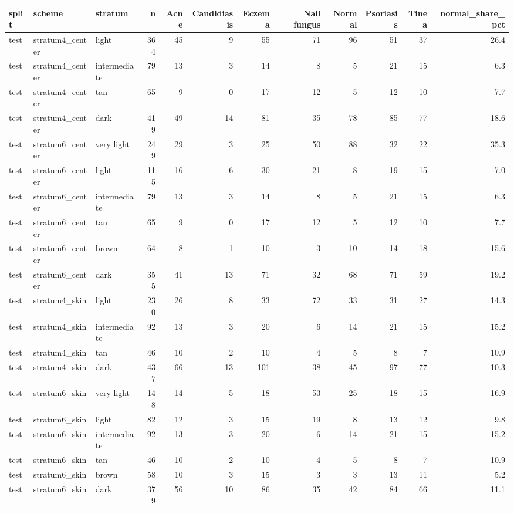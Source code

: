 \begin{tabular}{lllrrrrrrrrr}
\toprule
split & scheme & stratum & n & Acne & Candidiasis & Eczema & Nail fungus & Normal & Psoriasis & Tinea & normal\_share\_pct \\
\midrule
test & stratum4\_center & light & 364 & 45 & 9 & 55 & 71 & 96 & 51 & 37 & 26.4 \\
test & stratum4\_center & intermediate & 79 & 13 & 3 & 14 & 8 & 5 & 21 & 15 & 6.3 \\
test & stratum4\_center & tan & 65 & 9 & 0 & 17 & 12 & 5 & 12 & 10 & 7.7 \\
test & stratum4\_center & dark & 419 & 49 & 14 & 81 & 35 & 78 & 85 & 77 & 18.6 \\
test & stratum6\_center & very light & 249 & 29 & 3 & 25 & 50 & 88 & 32 & 22 & 35.3 \\
test & stratum6\_center & light & 115 & 16 & 6 & 30 & 21 & 8 & 19 & 15 & 7.0 \\
test & stratum6\_center & intermediate & 79 & 13 & 3 & 14 & 8 & 5 & 21 & 15 & 6.3 \\
test & stratum6\_center & tan & 65 & 9 & 0 & 17 & 12 & 5 & 12 & 10 & 7.7 \\
test & stratum6\_center & brown & 64 & 8 & 1 & 10 & 3 & 10 & 14 & 18 & 15.6 \\
test & stratum6\_center & dark & 355 & 41 & 13 & 71 & 32 & 68 & 71 & 59 & 19.2 \\
test & stratum4\_skin & light & 230 & 26 & 8 & 33 & 72 & 33 & 31 & 27 & 14.3 \\
test & stratum4\_skin & intermediate & 92 & 13 & 3 & 20 & 6 & 14 & 21 & 15 & 15.2 \\
test & stratum4\_skin & tan & 46 & 10 & 2 & 10 & 4 & 5 & 8 & 7 & 10.9 \\
test & stratum4\_skin & dark & 437 & 66 & 13 & 101 & 38 & 45 & 97 & 77 & 10.3 \\
test & stratum6\_skin & very light & 148 & 14 & 5 & 18 & 53 & 25 & 18 & 15 & 16.9 \\
test & stratum6\_skin & light & 82 & 12 & 3 & 15 & 19 & 8 & 13 & 12 & 9.8 \\
test & stratum6\_skin & intermediate & 92 & 13 & 3 & 20 & 6 & 14 & 21 & 15 & 15.2 \\
test & stratum6\_skin & tan & 46 & 10 & 2 & 10 & 4 & 5 & 8 & 7 & 10.9 \\
test & stratum6\_skin & brown & 58 & 10 & 3 & 15 & 3 & 3 & 13 & 11 & 5.2 \\
test & stratum6\_skin & dark & 379 & 56 & 10 & 86 & 35 & 42 & 84 & 66 & 11.1 \\

\end{tabular}
